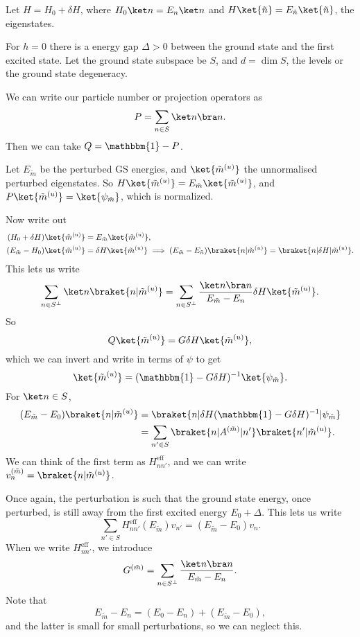 \documentclass[12pt]{article}
\begin{document}
Let $H = H_0 + \delta H$, where $H_0 \ket n = E_n \ket n$ and $H \ket{\tilde n} = E_{\tilde n} \ket{\tilde n}$, the eigenstates.

For $h = 0$ there is a energy gap $\Delta > 0$ between the ground state and the first excited state. Let the ground state subspace be $S$, and $d = \dim S$, the levels or the ground state degeneracy.

We can write our particle number or projection operators as 
\[
P = \sum_{n \in S} \ket n \bra n.
\]
Then we can take $Q = \mathbbm{1} - P$.

Let $E_{\tilde m}$ be the perturbed GS energies, and $\ket{\tilde m^{(u)}}$ the unnormalised perturbed eigenstates. So $H \ket{\tilde m^{(u)}} = E_{\tilde m} \ket{\tilde m^{(u)}}$, and $P\ket{\tilde m^{(u)}} = \ket{\psi_{\tilde m}}$, which is normalized.

Now write out
\begin{align*}
(H_0 + \delta H) \ket{\tilde m^{(u)}} &= E_{\tilde m} \ket{\tilde m^{(u)}}, \\
(E_{\tilde m} - H_0)\ket{\tilde m^{(u)}} &= \delta H \ket{\tilde m^{(u)}} \implies (E_{\tilde m} - E_{\tilde n}) \braket{n|\tilde m^{(u)}} = \braket{n | \delta H | \tilde m^{(u)}}.
\end{align*}
This lets us write
\[
	\sum_{n \in S^{\perp}} \ket n \braket{n|\tilde m^{(u)}} = \sum_{n \in S^{\perp}} \frac{\ket n \bra n}{E_{\tilde m} - E_n} \delta H \ket {\tilde m^{(u)}}.
\]
So
\[
	Q \ket{\tilde m^{(u)}} = G \delta H \ket {\tilde m^{(u)}},
\]
which we can invert and write in terms of $\psi$ to get
\[
	\ket{\tilde m^{(u)}} = (\mathbbm{1} - G \delta H)^{-1} \ket{\psi_{\tilde m}}.
\]
For $\ket n \in S$,
\begin{align*}
	(E_{\tilde m} - E_0) \braket{n|\tilde m^{(u)}} &= \braket{n|\delta H(\mathbbm{1} - G \delta H)^{-1} | \psi_{\tilde m}} \\
						       &= \sum_{n' \in S} \braket{n|A^{(\tilde m)}|n'} \braket{n'|\tilde m^{(u)}}.
\end{align*}
We can think of the first term as $H_{nn'}^{\mathrm{eff}}$, and we can write $v_n^{(\tilde m)} = \braket{n|\tilde m^{(u)}}$.


Once again, the perturbation is such that the ground state energy, once perturbed, is still away from the first excited energy $E_0 + \Delta$. This lets us write
\[
\sum_{n' \in S} H_{nn'}^{\mathrm{eff}}(E_{\tilde m}) v_{n'} = (E_{\tilde m} - E_0) v_n.
\]
When we write $H_{nn'}^{\mathrm{eff}}$, we introduce
\[
G^{(\tilde m)} = \sum_{n \in S^{\perp}} \frac{\ket n \bra n}{E_{\tilde m} - E_n}.
\]
Note that
\[
E_{\tilde m} - E_n = (E_0 - E_n) + (E_{\tilde m} - E_0),
\]
and the latter is small for small perturbations, so we can neglect this.
\end{document}
